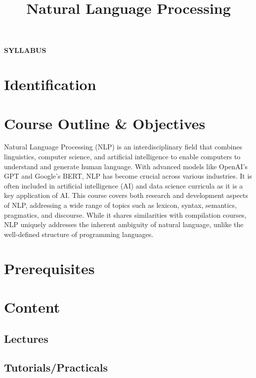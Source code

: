 \documentclass[hy]{esisyllabus}
\title{Natural Language Processing}
\begin{document}
	
	\begin{center}
		\huge\bfseries\color{darkblue} SYLLABUS
	\end{center}
	
	\section{Identification}

	\identification
	
	\section{Course Outline \& Objectives}

	Natural Language Processing (NLP) is an interdisciplinary field that combines linguistics, computer science, and artificial intelligence to enable computers to understand and generate human language. 
	With advanced models like OpenAI's GPT and Google's BERT, NLP has become crucial across various industries. 
	It is often included in artificial intelligence (AI) and data science curricula as it is a key application of AI. 
	This course covers both research and development aspects of NLP, addressing a wide range of topics such as lexicon, syntax, semantics, pragmatics, and discourse. 
	While it shares similarities with compilation courses, NLP uniquely addresses the inherent ambiguity of natural language, unlike the well-defined structure of programming languages.
	
	\objectives
	
	\section{Prerequisites}
	
	\prerequisites
	
	\section{Content}
	
	\subsection{Lectures}
	
	\chapters
	
	\subsection{Tutorials/Practicals}
	
\end{document}
